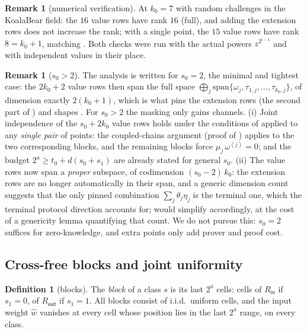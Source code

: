 \documentclass{article}
\newcommand{\extdeg}{d}
\theoremstyle{definition}
\newtheorem{definition}[theorem]{Definition}
\newtheorem{remark}[theorem]{Remark}
\begin{document}
\begin{remark}[numerical verification]
At $k_0 = 7$ with random challenges in the KoalaBear field: the $16$ value rows have rank $16$ (full), and adding the extension rows does not increase the rank; with a single point, the $15$ value rows have rank $8 = k_0 + 1$, matching . Both checks were run with the actual powers $z^{2^{i-1}}$ and with independent values in their place.
\end{remark}

\begin{remark}[$s_0 > 2$]\label{rem:s0}
The analysis is written for $s_0 = 2$, the minimal and tightest case: the $2k_0 + 2$ value rows then span the full space $\bigoplus_j \mathrm{span}\{\omega_j, \tau_{1,j}, \dots, \tau_{k_0,j}\}$, of dimension exactly $2(k_0 + 1)$, which is what pins the extension rows (the second part of ) and shapes . For $s_0 > 2$ the masking only gains channels. (i) Joint independence of the $s_0 + 2k_0$ value rows holds under the conditions of  applied to any \emph{single pair} of points: the coupled-chains argument (proof of ) applies to the two corresponding blocks, and the remaining blocks force $\mu_j\, \omega^{(j)} = 0$;  and the budget $2^a \geq t_0 + \extdeg(s_0 + s_1)$ are already stated for general $s_0$. (ii) The value rows now span a \emph{proper} subspace, of codimension $(s_0 - 2)\, k_0$: the extension rows are no longer automatically in their span, and a generic dimension count suggests that the only pinned combination $\sum_j \theta_j \eta_j$ is the terminal one, which the terminal protocol direction accounts for;  would simplify accordingly, at the cost of a genericity lemma quantifying that count. We do not pursue this: $s_0 = 2$ suffices for zero-knowledge, and extra points only add prover and proof cost.
\end{remark}

\subsection{Cross-free blocks and joint uniformity}\label{sec:uniform}

\begin{definition}[blocks]\label{def:blocks}
The \emph{block} of a class $s$ is its last $2^a$ cells: cells of $R_{\mathsf{in}}$ if $s_1 = 0$, of $R_{\mathsf{out}}$ if $s_1 = 1$. All blocks consist of i.i.d.\ uniform cells, and the input weight $\hat{w}$ vanishes at every cell whose position lies in the last $2^a$ range, on every class.
\end{definition}
\end{document}
